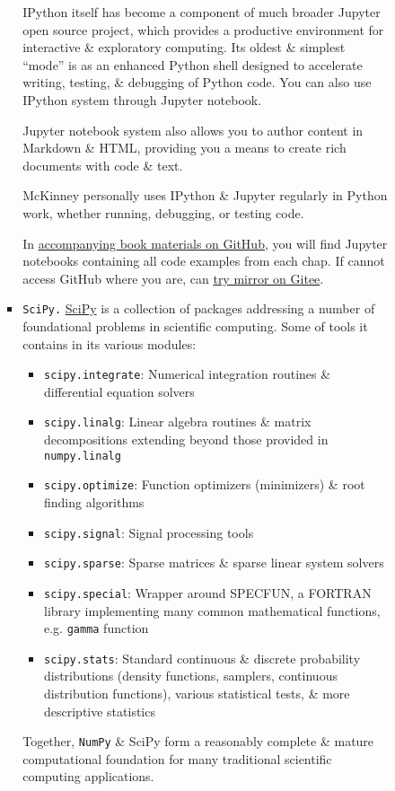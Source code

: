 \documentclass{article}
\begin{document}
\begin{enumerate}
\begin{itemize}
\begin{itemize}
\begin{itemize}
				IPython itself has become a component of much broader Jupyter open source project, which provides a productive environment for interactive \& exploratory computing. Its oldest \& simplest ``mode'' is as an enhanced Python shell designed to accelerate writing, testing, \& debugging of Python code. You can also use IPython system through Jupyter notebook.
				
				Jupyter notebook system also allows you to author content in Markdown \& HTML, providing you a means to create rich documents with code \& text.
				
				{\sc McKinney} personally uses IPython \& Jupyter regularly in Python work, whether running, debugging, or testing code.
				
				In \href{https://github.com/wesm/pydata-book}{accompanying book materials on GitHub}, you will find Jupyter notebooks containing all code examples from each chap. If cannot access GitHub where you are, can \href{https://gitee.com/wesmckinn/pydata-book}{try mirror on Gitee}.
				\item {\tt SciPy.} \href{https://scipy.org}{SciPy} is a collection of packages addressing a number of foundational problems in scientific computing. Some of tools it contains in its various modules:
				\begin{itemize}
					\item {\tt scipy.integrate}: Numerical integration routines \& differential equation solvers
					\item {\tt scipy.linalg}: Linear algebra routines \& matrix decompositions extending beyond those provided in {\tt numpy.linalg}
					\item {\tt scipy.optimize}: Function optimizers (minimizers) \& root finding algorithms
					\item {\tt scipy.signal}: Signal processing tools
					\item {\tt scipy.sparse}: Sparse matrices \& sparse linear system solvers
					\item {\tt scipy.special}: Wrapper around SPECFUN, a FORTRAN library implementing many common mathematical functions, e.g. {\tt gamma} function
					\item {\tt scipy.stats}: Standard continuous \& discrete probability distributions (density functions, samplers, continuous distribution functions), various statistical tests, \& more descriptive statistics
				\end{itemize}
				Together, {\tt NumPy} \& SciPy form a reasonably complete \& mature computational foundation for many traditional scientific computing applications.

\end{itemize}
\end{itemize}
\end{itemize}
\end{enumerate}
\end{document}
